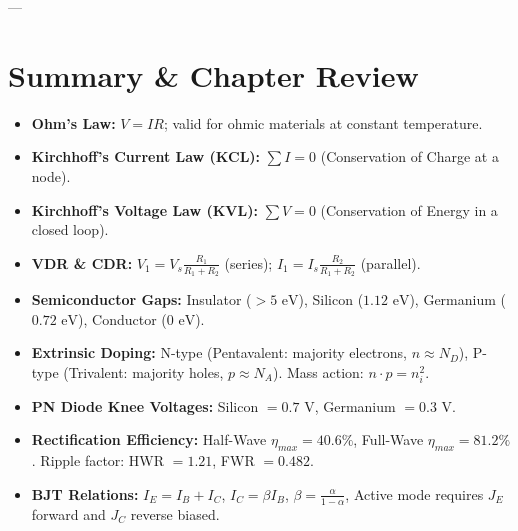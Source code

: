 ---

\section{Summary \& Chapter Review}
\begin{quickrevision}
\begin{itemize}
    \item \textbf{Ohm's Law:} $V = IR$; valid for ohmic materials at constant temperature.
    \item \textbf{Kirchhoff's Current Law (KCL):} $\sum I = 0$ (Conservation of Charge at a node).
    \item \textbf{Kirchhoff's Voltage Law (KVL):} $\sum V = 0$ (Conservation of Energy in a closed loop).
    \item \textbf{VDR \& CDR:} $V_1 = V_s \frac{R_1}{R_1+R_2}$ (series); $I_1 = I_s \frac{R_2}{R_1+R_2}$ (parallel).
    \item \textbf{Semiconductor Gaps:} Insulator ($>5\text{ eV}$), Silicon ($1.12\text{ eV}$), Germanium ($0.72\text{ eV}$), Conductor ($0\text{ eV}$).
    \item \textbf{Extrinsic Doping:} N-type (Pentavalent: majority electrons, $n \approx N_D$), P-type (Trivalent: majority holes, $p \approx N_A$). Mass action: $n \cdot p = n_i^2$.
    \item \textbf{PN Diode Knee Voltages:} Silicon $= 0.7\text{ V}$, Germanium $= 0.3\text{ V}$.
    \item \textbf{Rectification Efficiency:} Half-Wave $\eta_{max} = 40.6\%$, Full-Wave $\eta_{max} = 81.2\%$. Ripple factor: HWR $= 1.21$, FWR $= 0.482$.
    \item \textbf{BJT Relations:} $I_E = I_B + I_C$, $I_C = \beta I_B$, $\beta = \frac{\alpha}{1-\alpha}$, Active mode requires $J_E$ forward and $J_C$ reverse biased.
\end{itemize}
\end{quickrevision}

